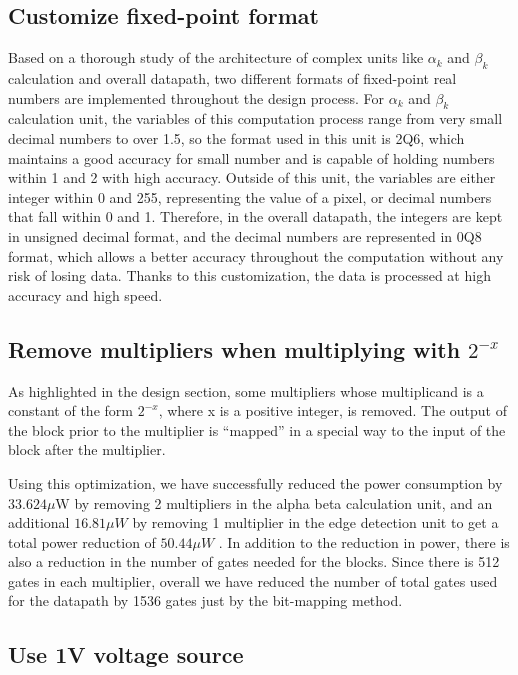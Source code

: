 \documentclass[letterpaper, 11pt]{article}
\begin{document}
	\subsection{Customize fixed-point format}
	\label{subsec:custom_fixed_point}
	Based on a thorough study of the architecture of complex units like $\alpha_k$ and $\beta_k$ calculation and overall datapath, two different formats of fixed-point real numbers are implemented throughout the design process. For $\alpha_k$ and $\beta_k$ calculation unit, the variables of this computation process range from very small decimal numbers to over 1.5, so the format used in this unit is 2Q6, which maintains a good accuracy for small number and is capable of holding numbers within 1 and 2 with high accuracy. Outside of this unit, the variables are either integer within 0 and 255, representing the value of a pixel, or decimal numbers that fall within 0 and 1. Therefore, in the overall datapath, the integers are kept in unsigned decimal format, and the decimal numbers are represented in 0Q8 format, which allows a better accuracy throughout the computation without any risk of losing data. 
	Thanks to this customization, the data is processed at high accuracy and high speed. 
	
	\subsection{Remove multipliers when multiplying with $2^{-x}$}
	\label{subsec:bit_mapping}
	
	As highlighted in the design section, some multipliers whose multiplicand is a constant of the form $2^{-x}$, where x is a positive integer, is removed. The output of the block prior to the multiplier is “mapped” in a special way to the input of the block after the multiplier. 
	
	Using this optimization, we have successfully reduced the power consumption by $33.624 \mu$W by removing 2 multipliers in the alpha beta calculation unit, and an additional $16.81 \mu W$ by removing 1 multiplier in the edge detection unit to get a total power reduction of $50.44 \mu W$ . In addition to the reduction in power, there is also a reduction in the number of gates needed for the blocks. Since there is 512 gates in each multiplier, overall we have reduced the number of total gates used for the datapath by 1536 gates just by the bit-mapping method.
	
	\subsection{Use 1V voltage source}
	\label{subsec:use1V}
	
\end{document}
